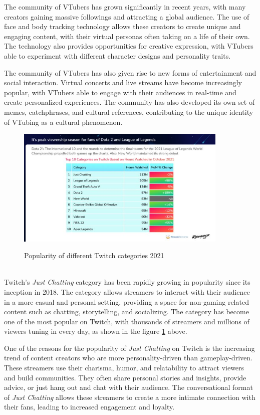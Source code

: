 The community of VTubers has grown significantly in recent years, with many creators gaining massive followings 
and attracting a global audience. The use of face and body tracking technology allows these creators to create 
unique and engaging content, with their virtual personas often taking on a life of their own. The technology 
also provides opportunities for creative expression, with VTubers able to experiment with different character 
designs and personality traits.

The community of VTubers has also given rise to new forms of entertainment and social interaction. Virtual 
concerts and live streams have become increasingly popular, with VTubers able to engage with their audiences 
in real-time and create personalized experiences. The community has also developed its own set of memes, 
catchphrases, and cultural references, contributing to the unique identity of VTubing as a cultural phenomenon.
\\
\begin{figure}[htb]
    \centering
    \includegraphics[width=0.9\textwidth]{pics/justchattwitch.jpg}
    \caption{Popularity of different Twitch categories 2021}
    \cite{geekwire}
    \label{fig:justchattwitch}
\end{figure}
\\
Twitch's \emph{Just Chatting} category has been rapidly growing in popularity since its inception in 2018. The category allows streamers 
to interact with their audience in a more casual and personal setting, providing a space for non-gaming related content such as chatting, 
storytelling, and socializing. The category has become one of the most popular on Twitch, with thousands of streamers and millions of 
viewers tuning in every day, as shown in the figure \ref{fig:justchattwitch} above.

One of the reasons for the popularity of \emph{Just Chatting} on Twitch is the increasing trend of content creators who are more 
personality-driven than gameplay-driven. These streamers use their charisma, humor, and relatability to attract viewers and build 
communities. They often share personal stories and insights, provide advice, or just hang out and chat with their audience. 
The conversational format of \emph{Just Chatting} allows these streamers to create a more intimate connection with their fans, 
leading to increased engagement and loyalty.

